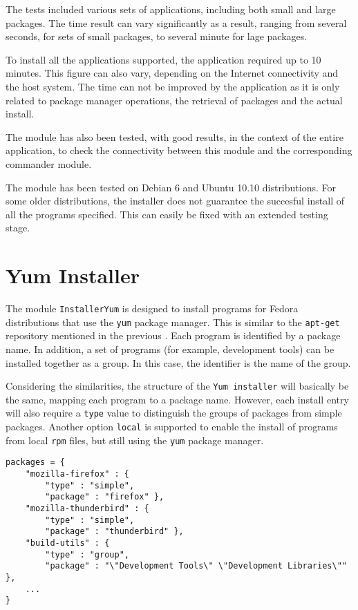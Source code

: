 The tests included various sets of applications, including both small and large 
packages. The time result can vary significantly as a result, ranging from several 
seconds, for sets of small packages, to several minute for lage packages.

To install all the applications supported, the application required up to 10 
minutes. This figure can also vary, depending on the Internet connectivity and 
the host system. The time can not be improved by the application as it is only 
related to package manager operations, the retrieval of packages and the actual 
install.

The module has also been tested, with good results, in the context of the 
entire application, to check the connectivity between this module and the 
corresponding commander module.

The module has been tested on Debian 6 and Ubuntu 10.10 distributions. 
For some older distributions, the installer does not guarantee the succesful 
install of all the programs specified. This can easily be fixed with an
extended testing stage.

\section{Yum Installer} \label{sec:yum-inst}
The module \texttt{InstallerYum} is designed to install programs for Fedora
distributions that use the \texttt{yum} package manager. This is similar to 
the \texttt{apt-get} repository mentioned in the previous 
. Each program is identified by a package 
name. In addition, a set of programs (for example, development tools) can be 
installed together as a group. In this case, the identifier is the name of the 
group\cite{yum}.

Considering the similarities, the structure of the \texttt{Yum installer} will 
basically be the same, mapping each program to a package name. However, 
each install entry will also require a \texttt{type} value to distinguish the 
groups of packages from simple packages. Another option \texttt{local} 
is supported to enable the install of programs from local \texttt{rpm} files, 
but still using the \texttt{yum} package manager.
\\
\lstset{language=Python,caption=Yum package name mapping,
label=lst:yum-dict}
\begin{lstlisting}
packages = {
	"mozilla-firefox" : {
		"type" : "simple",
		"package" : "firefox" },
	"mozilla-thunderbird" : {
		"type" : "simple",
		"package" : "thunderbird" },
	"build-utils" : {
		"type" : "group",
		"package" : "\"Development Tools\" \"Development Libraries\"" },
	...
}
\end{lstlisting}

